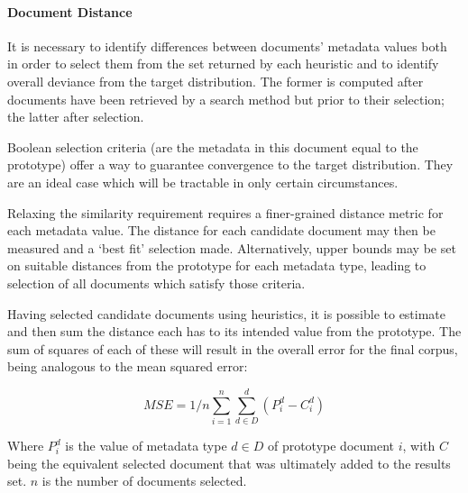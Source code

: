 \paragraph{Document Distance}
It is necessary to identify differences between documents' metadata values both in order to select them from the set returned by each heuristic and to identify overall deviance from the target distribution.  The former is computed after documents have been retrieved by a search method but prior to their selection; the latter after selection.

Boolean selection criteria (are the metadata in this document equal to the prototype) offer a way to guarantee convergence to the target distribution.  They are an ideal case which will be tractable in only certain circumstances.

Relaxing the similarity requirement requires a finer-grained distance metric for each metadata value.  The distance for each candidate document may then be measured and a `best fit' selection made.  Alternatively, upper bounds may be set on suitable distances from the prototype for each metadata type, leading to selection of all documents which satisfy those criteria.

Having selected candidate documents using heuristics, it is possible to estimate and then sum the distance each has to its intended value from the prototype.  The sum of squares of each of these will result in the overall error for the final corpus, being analogous to the mean squared error:

$$
MSE = 1/n\sum_{i=1}^{n}\sum_{d \in D}^{d}{(P_i^d - C_i^d)}
$$ 

Where $P_i^d$ is the value of metadata type $d \in D$ of prototype document $i$, with $C$ being the equivalent selected document that was ultimately added to the results set.  $n$ is the number of documents selected.









